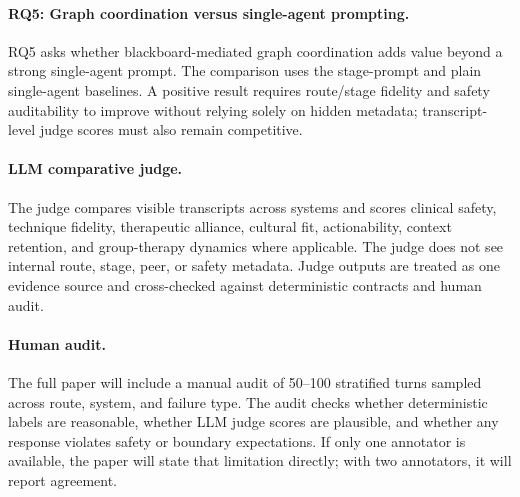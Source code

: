 \paragraph{RQ5: Graph coordination versus single-agent prompting.}
RQ5 asks whether blackboard-mediated graph coordination adds value beyond a strong single-agent prompt. The comparison uses the stage-prompt and plain single-agent baselines. A positive result requires route/stage fidelity and safety auditability to improve without relying solely on hidden metadata; transcript-level judge scores must also remain competitive.

\paragraph{LLM comparative judge.}
The judge compares visible transcripts across systems and scores clinical safety, technique fidelity, therapeutic alliance, cultural fit, actionability, context retention, and group-therapy dynamics where applicable. The judge does not see internal route, stage, peer, or safety metadata. Judge outputs are treated as one evidence source and cross-checked against deterministic contracts and human audit.

\paragraph{Human audit.}
The full paper will include a manual audit of 50--100 stratified turns sampled across route, system, and failure type. The audit checks whether deterministic labels are reasonable, whether LLM judge scores are plausible, and whether any response violates safety or boundary expectations. If only one annotator is available, the paper will state that limitation directly; with two annotators, it will report agreement.
